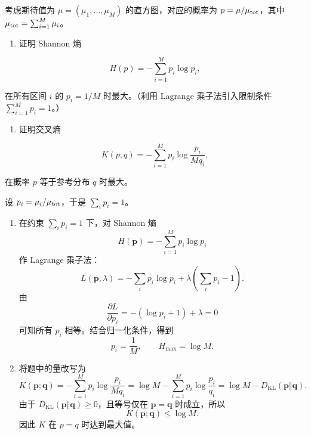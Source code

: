 \begin{question}
考虑期待值为 \(\mu=(\mu_1,\ldots,\mu_M)\) 的直方图，对应的概率为
\(p=\mu/\mu_{\rm tot}\)，其中 \(\mu_{\rm tot}=\sum_{i=1}^{M}\mu_i\)。

\begin{enumerate}
\item
  证明 Shannon 熵
\end{enumerate}

\[
H(p)=-\sum_{i=1}^{M}p_i\log p_i,
\]

在所有区间 \(i\) 的 \(p_i=1/M\) 时最大。（利用 Lagrange
乘子法引入限制条件 \(\sum_{i=1}^{M}p_i=1\)。）

\begin{enumerate}[start=2]
\item
  证明交叉熵
\end{enumerate}

\[
K(p;q)=-\sum_{i=1}^{M}p_i\log\frac{p_i}{Mq_i},
\]

在概率 \(p\) 等于参考分布 \(q\) 时最大。
\begin{solution}
设 \(p_i=\mu_i/\mu_{\rm tot}\)，于是 \(\sum_i p_i=1\)。

\begin{enumerate}
\item 在约束 \(\sum_i p_i=1\) 下，对 Shannon 熵
\[
H(\mathbf p)=-\sum_{i=1}^M p_i\log p_i
\]
作 Lagrange 乘子法：
\[
L(\mathbf p,\lambda)
=-\sum_i p_i\log p_i+\lambda\left(\sum_i p_i-1\right).
\]
由
\[
\frac{\partial L}{\partial p_i}=-(\log p_i+1)+\lambda=0
\]
可知所有 \(p_i\) 相等。结合归一化条件，得到
\[
p_i=\frac1M,\qquad H_{\max}=\log M.
\]

\item 将题中的量改写为
\[
K(\mathbf p;\mathbf q)
=-\sum_{i=1}^M p_i\log\frac{p_i}{Mq_i}
=\log M-\sum_{i=1}^M p_i\log\frac{p_i}{q_i}
=\log M-D_{\mathrm{KL}}(\mathbf p\Vert\mathbf q).
\]
由于 \(D_{\mathrm{KL}}(\mathbf p\Vert\mathbf q)\ge 0\)，且等号仅在
\(\mathbf p=\mathbf q\) 时成立，所以
\[
K(\mathbf p;\mathbf q)\le \log M.
\]
因此 \(K\) 在 \(p=q\) 时达到最大值。
\end{enumerate}
\end{solution}
\end{question}


